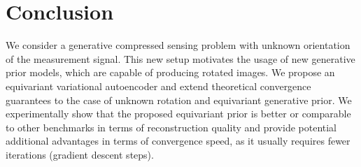 \section{Conclusion}
We consider a generative compressed sensing problem with unknown orientation of the measurement signal. This new setup motivates the usage of new generative prior models, which are capable of producing rotated images. We propose an equivariant variational autoencoder and extend theoretical convergence guarantees to the case of unknown rotation and equivariant generative prior. We experimentally show that the proposed equivariant prior is better or comparable to other benchmarks in terms of reconstruction quality and provide potential additional advantages in terms of convergence speed, as it usually requires fewer iterations (gradient descent steps).